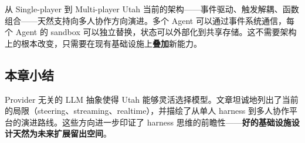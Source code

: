 \begin{knowledgebox}{从 Single-player 到 Multi-player}
Utah 当前的架构——事件驱动、触发解耦、函数组合——天然支持向多人协作方向演进。多个 Agent 可以通过事件系统通信，每个 Agent 的 sandbox 可以独立替换，状态可以外部化到共享存储。这不需要架构上的根本改变，只需要在现有基础设施上\textbf{叠加}新能力。
\end{knowledgebox}

\subsection{本章小结}

Provider 无关的 LLM 抽象使得 Utah 能够灵活选择模型。文章坦诚地列出了当前的局限（steering、streaming、realtime），并描绘了从单人 harness 到多人协作平台的演进路线。这些方向进一步印证了 harness 思维的前瞻性——\textbf{好的基础设施设计天然为未来扩展留出空间}。


